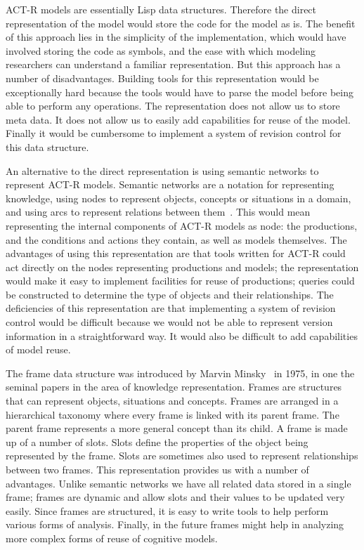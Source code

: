 ACT-R models are essentially Lisp data structures. Therefore the
direct representation of the model would store the code for the model
as is. The benefit of this approach lies in the simplicity of the
implementation, which would have involved storing the code as symbols,
and the ease with which modeling researchers can understand a familiar
representation. But this approach has a number of disadvantages.
Building tools for this representation would be exceptionally hard
because the tools would have to parse the model before being able to
perform any operations.  The representation does not allow us to store
meta data.  It does not allow us to easily add capabilities for reuse
of the model.  Finally it would be cumbersome to implement a system of
revision control for this data structure.

An alternative to the direct representation is using semantic networks
to represent ACT-R models. Semantic networks are a notation for
representing knowledge, using nodes to represent objects, concepts or
situations in a domain, and using arcs to represent relations between
them~\cite{Sowa87,Barr81}. This would mean representing the internal
components of ACT-R models as node: the productions, and the
conditions and actions they contain, as well as models themselves.
The advantages of using this representation are that tools written for
ACT-R could act directly on the nodes representing productions and
models; the representation would make it easy to implement facilities
for reuse of productions; queries could be constructed to determine
the type of objects and their relationships. The deficiencies of this
representation are that implementing a system of revision control
would be difficult because we would not be able to represent version
information in a straightforward way.  It would also be difficult to
add capabilities of model reuse.


The frame data structure was introduced by Marvin
Minsky~\cite{Minsky1974a} in 1975, in one the seminal papers in the
area of knowledge representation. Frames are structures that can
represent objects, situations and concepts. Frames are arranged in a
hierarchical taxonomy where every frame is linked with its parent
frame. The parent frame represents a more general concept than its
child\cite{karp-93}. A frame is made up of a number of slots. Slots
define the properties of the object being represented by the
frame. Slots are sometimes also used to represent relationships
between two frames. This representation provides us with a number of
advantages.  Unlike semantic networks we have all related data stored
in a single frame; frames are dynamic and allow slots and their values
to be updated very easily.  Since frames are structured, it is easy to
write tools to help perform various forms of analysis.  Finally, in
the future frames might help in analyzing more complex forms of reuse
of cognitive models.

